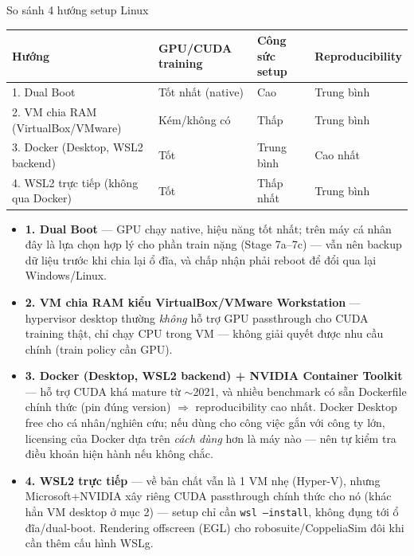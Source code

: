 \documentclass[aspectratio=169]{beamer}
\newcommand{\good}[1]{\textcolor{green!40!black}{#1}}
\newcommand{\bad}[1]{\textcolor{red!60!black}{#1}}
\begin{document}
\begin{frame}[t,shrink=8]{So sánh 4 hướng setup Linux}
\footnotesize
\begin{center}
\begin{tabular}{@{}l l l l@{}}
\toprule
\textbf{Hướng} & \textbf{GPU/CUDA training} & \textbf{Công sức setup} & \textbf{Reproducibility} \\
\midrule
1. Dual Boot & \good{Tốt nhất (native)} & Cao & Trung bình \\
2. VM chia RAM (VirtualBox/VMware) & \bad{Kém/không có} & Thấp & Trung bình \\
3. Docker (Desktop, WSL2 backend) & \good{Tốt} & Trung bình & \good{Cao nhất} \\
4. WSL2 trực tiếp (không qua Docker) & \good{Tốt} & \good{Thấp nhất} & Trung bình \\
\bottomrule
\end{tabular}
\end{center}
\vspace{6pt}
\begin{itemize}
    \item \textbf{1. Dual Boot} --- GPU chạy native, hiệu năng tốt nhất; trên máy cá nhân đây là lựa chọn hợp lý cho phần train nặng (Stage 7a--7c) --- vẫn nên backup dữ liệu trước khi chia lại ổ đĩa, và chấp nhận phải reboot để đổi qua lại Windows/Linux.
    \item \textbf{2. VM chia RAM kiểu VirtualBox/VMware Workstation} --- hypervisor desktop thường \emph{không} hỗ trợ GPU passthrough cho CUDA training thật, chỉ chạy CPU trong VM --- không giải quyết được nhu cầu chính (train policy cần GPU).
    \item \textbf{3. Docker (Desktop, WSL2 backend) + NVIDIA Container Toolkit} --- hỗ trợ CUDA khá mature từ $\sim$2021, và nhiều benchmark có sẵn Dockerfile chính thức (pin đúng version) $\Rightarrow$ reproducibility cao nhất. Docker Desktop free cho cá nhân/nghiên cứu; nếu dùng cho công việc gắn với công ty lớn, licensing của Docker dựa trên \emph{cách dùng} hơn là máy nào --- nên tự kiểm tra điều khoản hiện hành nếu không chắc.
    \item \textbf{4. WSL2 trực tiếp} --- về bản chất vẫn là 1 VM nhẹ (Hyper-V), nhưng Microsoft+NVIDIA xây riêng CUDA passthrough chính thức cho nó (khác hẳn VM desktop ở mục 2) --- setup chỉ cần \texttt{wsl --install}, không đụng tới ổ đĩa/dual-boot. Rendering offscreen (EGL) cho robosuite/CoppeliaSim đôi khi cần thêm cấu hình WSLg.
\end{itemize}
\end{frame}
\end{document}
